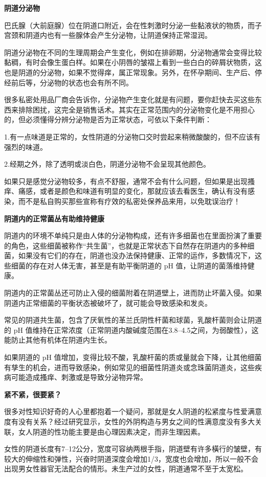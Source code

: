 \documentclass[12pt,UTF8]{ctexbook}
\begin{document}
\textbf{阴道分泌物}

巴氏腺（大前庭腺）位在阴道口附近，会在性刺激时分泌一些黏液状的物质，而子宫颈和阴道内也有一些腺体会产生分泌物，让阴道保持正常湿润。

阴道分泌物在不同的生理周期会产生变化，例如在排卵期，分泌物通常会变得比较黏稠，有时会像生蛋白样。如果在小阴唇的皱褶上看到一些白白的碎屑状物质，这也是阴道的分泌物，如果不觉得痒，属正常现象。另外，在怀孕期间、生产后、停经前后等，分泌物的状态也会有所不同。

很多私密处用品厂商会告诉你，分泌物产生变化就是有问题，要你赶快去买这些东西来排除困扰，这完全是销售话术。其实在正常范围内的分泌物变化是不用担心的，但必须懂得分辨分泌物是否为正常状态，可依以下条件判断：

1.有一点味道是正常的，女性阴道的分泌物口交时尝起来稍微酸酸的，但不应该有强烈的味道。

2.经期之外，除了透明或淡白色，阴道分泌物不会呈现其他颜色。

如果只是感觉分泌物较多，有点不舒服，通常不会有什么问题，但如果是出现搔痒、痛感，或者是颜色和味道有明显的变化，那就应该去看医生，确认有没有感染，而不是私自购买那些宣称有疗效的私密处保养品来用，以免耽误治疗！

\textbf{阴道内的正常菌丛有助维持健康}

阴道内的环境不单纯只是由人体的分泌物构成，还有许多细菌也在里面扮演了重要的角色，这些细菌被称作“共生菌”，也就是正常状态下自然存在阴道内的多种细菌，如果没有它们的存在，阴道也没办法保持健康、正常的运作，多数情况下，这些细菌的存在对人体无害，甚至是有助平衡阴道的 pH 值，让阴道的菌落维持健康。

阴道内的正常菌丛还可防止入侵的细菌附着在阴道壁上，进而防止坏菌入侵。如果阴道内正常细菌的平衡状态被破坏了，就可能会导致感染和发炎。

常见的阴道共生菌，包含了厌氧性的革兰氏阴性杆菌和球菌，乳酸杆菌则会让阴道的 pH 值维持在正常浓度（正常阴道内酸碱度范围在3.8--4.5之间，为弱酸性），这能防止其他有机体在阴道内生长。

如果阴道的 pH 值增加，变得比较不酸，乳酸杆菌的质或量就会下降，让其他细菌有孳生的机会，进而导致感染，例如常见的细菌性阴道炎或念珠菌阴道炎，这些疾病可能造成搔痒、刺激或是导致分泌物异常。

\textbf{紧不紧，很要紧？}

很多对性知识好奇的人心里都抱着一个疑问，那就是女人阴道的松紧度与性爱满意度有没有关系？经过研究显示，女性的外阴构造与男女之间的性满意度没有多大关联，女人阴道的性功能主要是由心理因素决定，而非生理因素。

女性的阴道长度有7--12公分，宽度可容纳两根手指，阴道壁有许多橫行的皱壁，有较大的伸缩性和弹性，兴奋时阴道深度会增加1/3，宽度也会增加，所以一般不会出现男女性器官无法配合的情形。未生产过的女性，阴道通常不至于太宽松。
\end{document}
